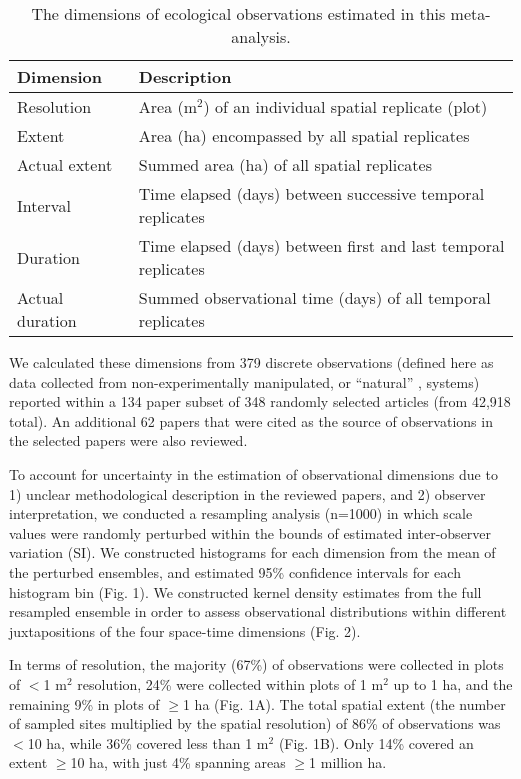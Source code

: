 \documentclass[12pt]{article}
\begin{document}
\begin{table}[htp]
\caption{The dimensions of ecological observations estimated in this meta-analysis.}
\begin{center}
\begin{tabular}{ll}
\hline
\textbf{Dimension} & \textbf{Description} \\
\hline
Resolution & Area (m$^2$) of an individual spatial replicate (plot) \\
Extent & Area (ha) encompassed by all spatial replicates \\
Actual extent & Summed area (ha) of all spatial replicates\\
Interval & Time elapsed (days) between successive temporal replicates \\
Duration & Time elapsed (days) between first and last temporal replicates\\
Actual duration & Summed observational time (days) of all temporal replicates\\
\hline
\end{tabular}
\end{center}
\label{default}
\end{table}%

We calculated these dimensions from 379 discrete observations (defined here as data collected from non-experimentally manipulated, or ``natural'' \cite{tilman_ecological_1989}, systems) reported within a 134 paper subset of 348 randomly selected articles (from 42,918 total). An additional 62 papers that were cited as the source of observations in the selected papers were also reviewed. 

To account for uncertainty in the estimation of observational dimensions due to 1) unclear methodological description in the reviewed papers, and 2) observer interpretation, we conducted a resampling analysis (n=1000) in which scale values were randomly perturbed within the bounds of estimated inter-observer variation (SI). We constructed histograms for each dimension from the mean of the perturbed ensembles, and estimated 95\% confidence intervals for each histogram bin (Fig. 1). We constructed  kernel density estimates from the full resampled ensemble in order to assess observational distributions within different juxtapositions of the four space-time dimensions (Fig. 2). 

In terms of resolution, the majority (67\%) of observations were collected in plots of $<$1 m$^2$ resolution, 24\% were collected within plots of 1 m$^2$ up to 1 ha, and the remaining 9\% in plots of $\geq$1 ha (Fig. 1A). The total spatial extent (the number of sampled sites multiplied by the spatial resolution) of 86\% of observations was $<$10 ha, while 36\% covered less than 1 m$^2$ (Fig. 1B). Only 14\% covered an extent $\geq$10 ha, with just 4\% spanning areas $\geq$1 million ha. 
\end{document}
